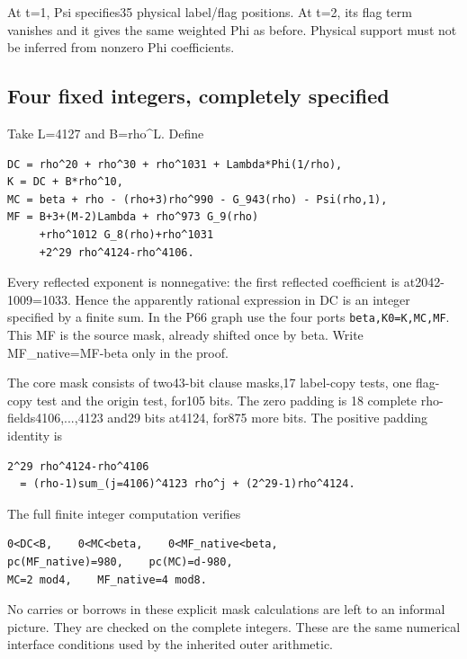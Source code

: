 At t=1, Psi specifies35 physical label/flag positions. At t=2, its flag term vanishes and it gives the same weighted Phi as before. Physical support must not be inferred from nonzero Phi coefficients.

\subsection{Four fixed integers, completely specified}
Take L=4127 and B=rho\textasciicircum{}L. Define

\begin{Verbatim}[fontsize=\small,breaklines=true,breakanywhere=true,breaksymbolleft={}]
DC = rho^20 + rho^30 + rho^1031 + Lambda*Phi(1/rho),
K = DC + B*rho^10,
MC = beta + rho - (rho+3)rho^990 - G_943(rho) - Psi(rho,1),
MF = B+3+(M-2)Lambda + rho^973 G_9(rho)
     +rho^1012 G_8(rho)+rho^1031
     +2^29 rho^4124-rho^4106.
\end{Verbatim}

Every reflected exponent is nonnegative: the first reflected coefficient is at2042-1009=1033. Hence the apparently rational expression in DC is an integer specified by a finite sum. In the P66 graph use the four ports \texttt{beta,K0=K,MC,MF}. This MF is the source mask, already shifted once by beta. Write MF\_native=MF-beta only in the proof.

The core mask consists of two43-bit clause masks,17 label-copy tests, one flag-copy test and the origin test, for105 bits. The zero padding is 18 complete rho-fields4106,...,4123 and29 bits at4124, for875 more bits. The positive padding identity is

\begin{Verbatim}[fontsize=\small,breaklines=true,breakanywhere=true,breaksymbolleft={}]
2^29 rho^4124-rho^4106
  = (rho-1)sum_(j=4106)^4123 rho^j + (2^29-1)rho^4124.
\end{Verbatim}

The full finite integer computation verifies

\begin{Verbatim}[fontsize=\small,breaklines=true,breakanywhere=true,breaksymbolleft={}]
0<DC<B,    0<MC<beta,    0<MF_native<beta,
pc(MF_native)=980,    pc(MC)=d-980,
MC=2 mod4,    MF_native=4 mod8.
\end{Verbatim}

No carries or borrows in these explicit mask calculations are left to an informal picture. They are checked on the complete integers. These are the same numerical interface conditions used by the inherited outer arithmetic.

